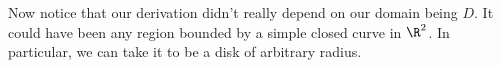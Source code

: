 \documentclass[a4paper]{article}
\begin{document}
%

Now notice that our derivation didn't really depend on our domain being $D$. It could have been any region bounded by a simple closed curve in $\R^2$. In particular, we can take it to be a disk of arbitrary radius.
\end{document}
